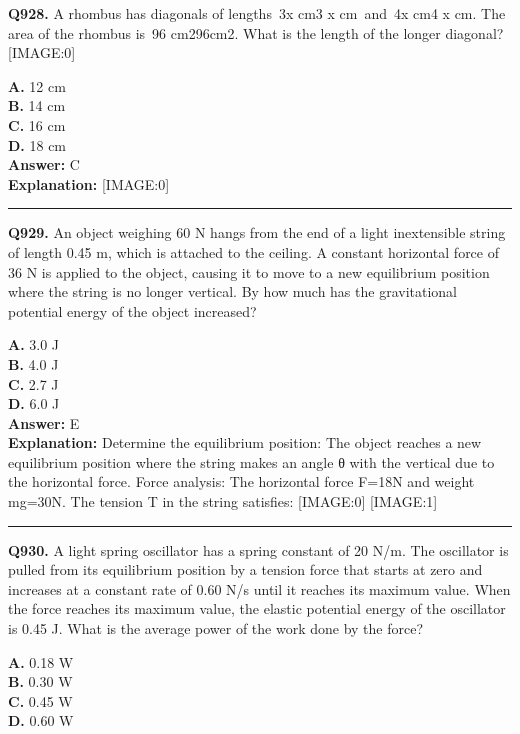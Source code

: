 \documentclass[12pt]{article}
\begin{document}
\noindent
\textbf{Q928.} A rhombus has diagonals of lengths 3x
cm3
x
cm and 4x
cm4
x
cm. The area of the rhombus is 96
cm296cm2. What is the length of the longer diagonal?
[IMAGE:0]



\textbf{A.} 12 cm \\
\textbf{B.} 14 cm \\
\textbf{C.} 16 cm \\
\textbf{D.} 18 cm \\

\textbf{Answer:} C \\
\textbf{Explanation:} [IMAGE:0]

\hrule
\vspace{1em}


\noindent
\textbf{Q929.} An object weighing 60 N hangs from the end of a light inextensible string of length 0.45 m, which is attached to the ceiling. A constant horizontal force of 36 N is applied to the object, causing it to move to a new equilibrium position where the string is no longer vertical. By how much has the gravitational potential energy of the object increased?



\textbf{A.} 3.0 J \\
\textbf{B.} 4.0 J \\
\textbf{C.} 2.7 J \\
\textbf{D.} 6.0 J \\

\textbf{Answer:} E \\
\textbf{Explanation:} Determine the equilibrium position: The object reaches a new equilibrium position where the string makes an angle θ with the vertical due to the horizontal force.
Force analysis: The horizontal force F=18N and weight mg=30N. The tension T in the string satisfies:
[IMAGE:0]
[IMAGE:1]

\hrule
\vspace{1em}


\noindent
\textbf{Q930.} A light spring oscillator has a spring constant of 20 N/m. The oscillator is pulled from its equilibrium position by a tension force that starts at zero and increases at a constant rate of 0.60 N/s until it reaches its maximum value. When the force reaches its maximum value, the elastic potential energy of the oscillator is 0.45 J. What is the average power of the work done by the force?



\textbf{A.} 0.18 W \\
\textbf{B.} 0.30 W \\
\textbf{C.} 0.45 W \\
\textbf{D.} 0.60 W \\
\end{document}
